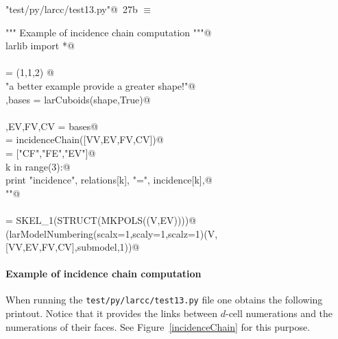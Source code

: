 \documentclass[11pt,oneside]{article}	%
\begin{document}
\begin{flushleft} \small \label{scrap45}
\protect{}\verb@"test/py/larcc/test13.py"@\nobreak\ {\footnotesize 27b }$\equiv$
\vspace{-1ex}
\begin{list}{}{} \item
\mbox{}\verb@""" Example of incidence chain computation """@\\
\mbox{}\verb@from larlib import *@\\
\mbox{}\verb@@\\
\mbox{}\verb@shape = (1,1,2) @\\
\mbox{}\verb@print "\n\nFor a better example provide a greater shape!"@\\
\mbox{}\verb@V,bases = larCuboids(shape,True)@\\
\mbox{}\verb@@\\
\mbox{}\verb@VV,EV,FV,CV = bases@\\
\mbox{}\verb@incidence = incidenceChain([VV,EV,FV,CV])@\\
\mbox{}\verb@relations = ["CF","FE","EV"]@\\
\mbox{}\verb@for k in range(3):@\\
\mbox{}\verb@   print "\n\n incidence", relations[k], "=\n", incidence[k],@\\
\mbox{}\verb@print "\n\n"@\\
\mbox{}\verb@@\\
\mbox{}\verb@submodel = SKEL_1(STRUCT(MKPOLS((V,EV))))@\\
\mbox{}\verb@VIEW(larModelNumbering(scalx=1,scaly=1,scalz=1)(V,[VV,EV,FV,CV],submodel,1))@\\
\mbox{}\verb@@{\NWsep}
\end{list}
\vspace{-2ex}
\end{flushleft}


\paragraph{Example of incidence chain computation}
When running the \texttt{test/py/larcc/test13.py} file one obtains the following printout. 
Notice that 
it provides the links between $d$-cell numerations and the numerations of their faces.
See Figure~\ref{incidenceChain} for this purpose.
\end{document}
